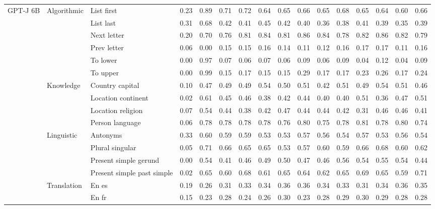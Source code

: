 \begin{center}
\begin{longtable}{lllrrrrrrrrrrrrr}
\multirow[t]{18}{*}{GPT-J 6B} & \multirow[t]{6}{*}{Algorithmic} & List first & 0.23 & 0.89 & 0.71 & 0.72 & 0.64 & 0.65 & 0.66 & 0.65 & 0.68 & 0.65 & 0.64 & 0.60 & 0.66 \\
 &  & List last & 0.31 & 0.68 & 0.42 & 0.41 & 0.45 & 0.42 & 0.40 & 0.36 & 0.38 & 0.41 & 0.39 & 0.35 & 0.39 \\
 &  & Next letter & 0.20 & 0.70 & 0.76 & 0.81 & 0.84 & 0.81 & 0.86 & 0.84 & 0.78 & 0.82 & 0.86 & 0.82 & 0.79 \\
 &  & Prev letter & 0.06 & 0.00 & 0.15 & 0.15 & 0.16 & 0.14 & 0.11 & 0.12 & 0.16 & 0.17 & 0.17 & 0.11 & 0.16 \\
 &  & To lower & 0.00 & 0.97 & 0.07 & 0.06 & 0.07 & 0.06 & 0.09 & 0.06 & 0.09 & 0.04 & 0.12 & 0.04 & 0.09 \\
 &  & To upper & 0.00 & 0.99 & 0.15 & 0.17 & 0.15 & 0.15 & 0.29 & 0.17 & 0.17 & 0.23 & 0.26 & 0.17 & 0.24 \\
\cline{2-16}
 & \multirow[t]{4}{*}{Knowledge} & Country capital & 0.10 & 0.47 & 0.49 & 0.49 & 0.54 & 0.50 & 0.51 & 0.42 & 0.51 & 0.49 & 0.54 & 0.51 & 0.46 \\
 &  & Location continent & 0.02 & 0.61 & 0.45 & 0.46 & 0.38 & 0.42 & 0.44 & 0.40 & 0.40 & 0.51 & 0.36 & 0.47 & 0.51 \\
 &  & Location religion & 0.07 & 0.54 & 0.44 & 0.38 & 0.42 & 0.47 & 0.44 & 0.44 & 0.42 & 0.31 & 0.46 & 0.46 & 0.41 \\
 &  & Person language & 0.06 & 0.78 & 0.78 & 0.78 & 0.78 & 0.76 & 0.80 & 0.75 & 0.78 & 0.81 & 0.78 & 0.80 & 0.74 \\
\cline{2-16}
 & \multirow[t]{4}{*}{Linguistic} & Antonyms & 0.33 & 0.60 & 0.59 & 0.59 & 0.53 & 0.53 & 0.57 & 0.56 & 0.54 & 0.57 & 0.53 & 0.56 & 0.54 \\
 &  & Plural singular & 0.05 & 0.71 & 0.66 & 0.65 & 0.65 & 0.53 & 0.57 & 0.60 & 0.59 & 0.66 & 0.68 & 0.60 & 0.62 \\
 &  & Present simple gerund & 0.00 & 0.54 & 0.41 & 0.46 & 0.49 & 0.50 & 0.47 & 0.46 & 0.56 & 0.54 & 0.55 & 0.54 & 0.44 \\
 &  & Present simple past simple & 0.02 & 0.65 & 0.60 & 0.68 & 0.61 & 0.65 & 0.64 & 0.62 & 0.65 & 0.69 & 0.65 & 0.59 & 0.71 \\
\cline{2-16}
 & \multirow[t]{4}{*}{Translation} & En es & 0.19 & 0.26 & 0.31 & 0.33 & 0.34 & 0.36 & 0.36 & 0.34 & 0.33 & 0.31 & 0.34 & 0.36 & 0.35 \\
 &  & En fr & 0.15 & 0.23 & 0.28 & 0.24 & 0.26 & 0.30 & 0.23 & 0.28 & 0.29 & 0.30 & 0.29 & 0.28 & 0.28 \\

\end{longtable}
\end{center}
